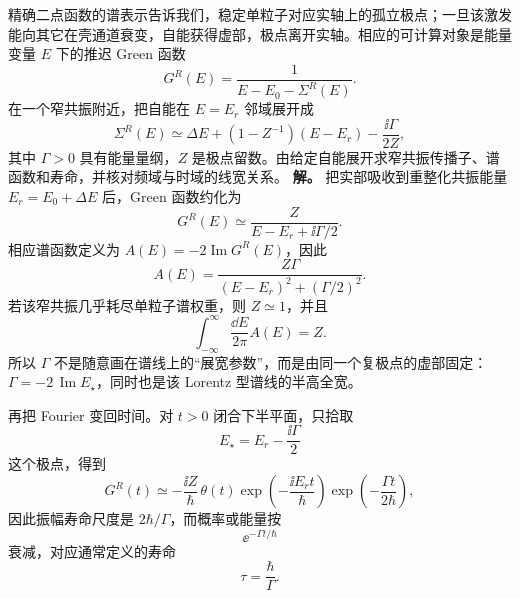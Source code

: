 
\begin{exbox}
精确二点函数的谱表示告诉我们，稳定单粒子对应实轴上的孤立极点；一旦该激发能向其它在壳通道衰变，自能获得虚部，极点离开实轴。相应的可计算对象是能量变量 $E$ 下的推迟 Green 函数
\begin{equation*}
 G^R(E)=\frac{1}{E-E_0-\Sigma^R(E)}.
\end{equation*}
在一个窄共振附近，把自能在 $E=E_r$ 邻域展开成
\begin{equation*}
 \Sigma^R(E)
 \simeq \Delta E
 +(1-Z^{-1})(E-E_r)
 -\frac{\ii\Gamma}{2Z},
\end{equation*}
其中 $\Gamma>0$ 具有能量量纲，$Z$ 是极点留数。由给定自能展开求窄共振传播子、谱函数和寿命，并核对频域与时域的线宽关系。
\textbf{解。} 把实部吸收到重整化共振能量 $E_r=E_0+\Delta E$ 后，Green 函数约化为
\begin{equation}
 {
 G^R(E)\simeq
 \frac{Z}{E-E_r+\ii\Gamma/2}.}
 \label{eq:dyson-pole-breit-wigner-dp65}
\end{equation}
相应谱函数定义为 $A(E)=-2\operatorname{Im}G^R(E)$，因此
\begin{equation}
 {
 A(E)=
 \frac{Z\Gamma}{(E-E_r)^2+(\Gamma/2)^2}.}
 \label{eq:dyson-lorentzian-spectral-dp65}
\end{equation}
若该窄共振几乎耗尽单粒子谱权重，则 $Z\simeq1$，并且
\begin{equation*}
 \int_{-\infty}^{\infty}\frac{\dd E}{2\pi}A(E)=Z.
\end{equation*}
所以 $\Gamma$ 不是随意画在谱线上的“展宽参数”，而是由同一个复极点的虚部固定：$\Gamma=-2\,\operatorname{Im}E_\star$，同时也是该 Lorentz 型谱线的半高全宽。

再把 Fourier 变回时间。对 $t>0$ 闭合下半平面，只拾取
\begin{equation*}
 E_\star=E_r-\frac{\ii\Gamma}{2}
\end{equation*}
这个极点，得到
\begin{equation*}
 G^R(t)\simeq
 -\frac{\ii Z}{\hbar}\,\theta(t)
 \exp\!\left(-\frac{\ii E_rt}{\hbar}\right)
 \exp\!\left(-\frac{\Gamma t}{2\hbar}\right),
\end{equation*}
因此振幅寿命尺度是 $2\hbar/\Gamma$，而概率或能量按
\begin{equation*}
 \ee^{-\Gamma t/\hbar}
\end{equation*}
衰减，对应通常定义的寿命
\begin{equation}
 {\tau=\frac{\hbar}{\Gamma}.}
 \label{eq:width-lifetime-si-dp65}
\end{equation}


\end{exbox}
